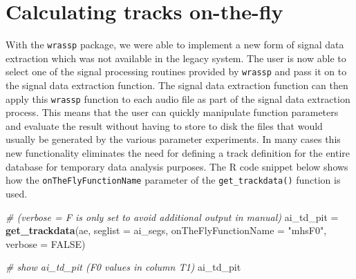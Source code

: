 \documentclass[]{book}
\newenvironment{Shaded}{\begin{snugshade}}{\end{snugshade}}
\newcommand{\CommentTok}[1]{\textcolor[rgb]{0.56,0.35,0.01}{\textit{#1}}}
\newcommand{\DataTypeTok}[1]{\textcolor[rgb]{0.13,0.29,0.53}{#1}}
\newcommand{\KeywordTok}[1]{\textcolor[rgb]{0.13,0.29,0.53}{\textbf{#1}}}
\newcommand{\NormalTok}[1]{#1}
\newcommand{\OtherTok}[1]{\textcolor[rgb]{0.56,0.35,0.01}{#1}}
\newcommand{\StringTok}[1]{\textcolor[rgb]{0.31,0.60,0.02}{#1}}
\begin{document}
\hypertarget{calculating-tracks-on-the-fly}{%
\section{Calculating tracks on-the-fly}\label{calculating-tracks-on-the-fly}}

With the \texttt{wrassp} package, we were able to implement a new form of signal data extraction which was not available in the legacy system. The user is now able to select one of the signal processing routines provided by \texttt{wrassp} and pass it on to the signal data extraction function. The signal data extraction function can then apply this \texttt{wrassp} function to each audio file as part of the signal data extraction process. This means that the user can quickly manipulate function parameters and evaluate the result without having to store to disk the files that would usually be generated by the various parameter experiments. In many cases this new functionality eliminates the need for defining a track definition for the entire database for temporary data analysis purposes. The R code snippet below shows how the \texttt{onTheFlyFunctionName} parameter of the \texttt{get\_trackdata()} function is used.

\begin{Shaded}
\begin{Highlighting}[]
\CommentTok{# (verbose = F is only set to avoid additional output in manual)}
\NormalTok{ai_td_pit =}\StringTok{ }\KeywordTok{get_trackdata}\NormalTok{(ae,}
                          \DataTypeTok{seglist =}\NormalTok{ ai_segs,}
                          \DataTypeTok{onTheFlyFunctionName =} \StringTok{"mhsF0"}\NormalTok{,}
                          \DataTypeTok{verbose =} \OtherTok{FALSE}\NormalTok{)}

\CommentTok{# show ai_td_pit (F0 values in column T1)}
\NormalTok{ai_td_pit}
\end{Highlighting}
\end{Shaded}
\end{document}
